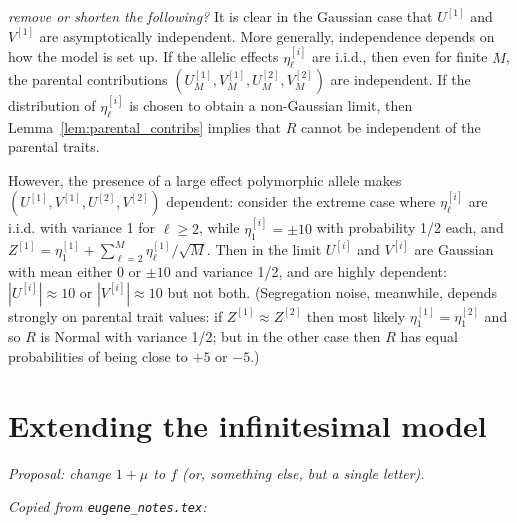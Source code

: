 \documentclass{article}
\newcommand{\comment}[1]{{\color{blue} \it #1}}
\theoremstyle{remark}
\theoremstyle{definition}
\begin{document}
\comment{remove or shorten the following?}
It is clear in the Gaussian case
that $U^{[1]}$ and $V^{[1]}$ are asymptotically independent.
More generally, independence depends on how the model is set up.
If the allelic effects $\eta_\ell^{[i]}$ are i.i.d.,
then even for finite $M$, the parental contributions
$(U_M^{[1]}, V_M^{[1]}, U_M^{[2]}, V_M^{[2]})$ are independent.
If the distribution of $\eta_\ell^{[i]}$ is chosen to obtain a non-Gaussian limit,
then Lemma~\ref{lem:parental_contribs} implies that $R$ cannot be independent of the parental traits.

However, the presence of a large effect polymorphic allele
makes $(U^{[1]}, V^{[1]}, U^{[2]}, V^{[2]})$ dependent:
consider the extreme case where $\eta^{[i]}_\ell$ are i.i.d.{} with variance 1 for $\ell \ge 2$,
while $\eta^{[i]}_1 = \pm 10$ with probability 1/2 each,
and $Z^{[1]} = \eta_1^{[1]} + \sum_{\ell=2}^M \eta_\ell^{[1]} / \sqrt{M}$.
Then in the limit $U^{[i]}$ and $V^{[i]}$ are Gaussian with mean either 0 or $\pm 10$ and variance 1/2,
and are highly dependent: $|U^{[i]}| \approx 10$ or $|V^{[i]}| \approx 10$ but not both.
(Segregation noise, meanwhile, depends strongly on parental trait values:
if $Z^{[1]} \approx Z^{[2]}$ then most likely
$\eta_1^{[1]} = \eta_1^{[2]}$ and so $R$ is Normal with variance 1/2;
but in the other case then $R$ has equal probabilities of being close to $+5$ or $-5$.)


\section{Extending the infinitesimal model}  %

\comment{Proposal: change $1 + \mu$ to $f$ (or, something else, but a single letter).}

\comment{Copied from \texttt{eugene\_notes.tex}:}
\end{document}
